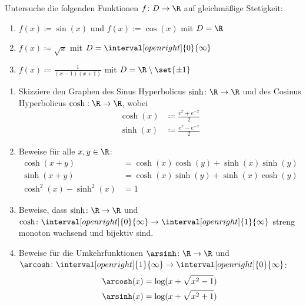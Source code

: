 \begin{prob}
  Untersuche die folgenden Funktionen $f \colon D \to \R$ auf gleichmäßige
  Stetigkeit:
  \begin{enumerate}[label=(\alph*)]
  \item $f(x) \coloneqq \sin(x)$ und $f(x) := \cos(x)$ mit $D = \R$
  \item $f(x) \coloneqq \sqrt{x}$ mit $D = \interval[open right]{0}{\infty}$
  \item $f(x) \coloneqq \frac{1}{(x-1)(x+1)}$ mit $D = \R \setminus \set{\pm 1}$
  \end{enumerate}
\end{prob}

\begin{prob}
  \begin{enumerate}[label=(\alph*)]
  \item Skizziere den Graphen des Sinus Hyperbolicus
    $\sinh \colon \R\to\R$ und des Cosinus Hyperbolicus
    $\cosh:\R\to\R$, wobei
    \begin{equation*}
      \begin{split}
        \cosh(x) &\coloneqq \frac{e^x + e^{-x}}{2}\\
        \sinh(x) &\coloneqq \frac{e^x - e^{-x}}{2}
      \end{split}
    \end{equation*}
  \item Beweise für alle $x,y\in\R$:
    \begin{equation*}
      \begin{split}
        \cosh(x+y) &= \cosh(x)\cosh(y)+\sinh(x)\sinh(y)\\
        \sinh(x+y) &= \cosh(x)\sinh(y)+\sinh(x)\cosh(y)\\
        \cosh^2(x) - \sinh^2(x) &= 1
      \end{split}
    \end{equation*}
  \item Beweise, dass $\sinh \colon \R \to \R$ und
    $\cosh \colon \interval[open right]{0}{\infty} \to \interval[open
    right]{1}{\infty}$ streng monoton wachsend und bijektiv sind.
  \item Beweise für die Umkehrfunktionen $\arsinh \colon \R \to \R$ und
    $\arcosh \colon \interval[open right]{1}{\infty} \to \interval[open
    right]{0}{\infty}$:
    \begin{equation*}
      \begin{split}
        \arcosh(x) &= \log(x + \sqrt{x^2 - 1})\\
        \arsinh(x) &= \log(x + \sqrt{x^2 + 1})
      \end{split}
    \end{equation*}
  \end{enumerate}
\end{prob}
